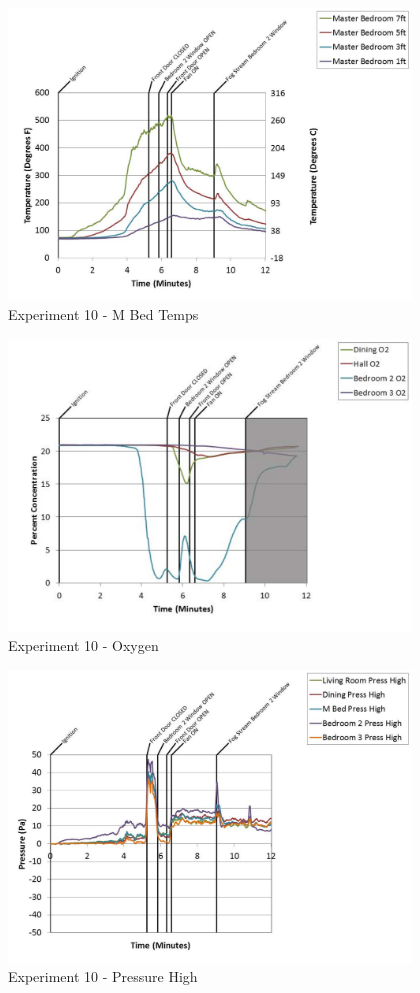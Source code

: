 \documentclass{article}
\begin{document}
\begin{appendices}
	\clearpage

	\begin{figure}[h!]
		\centering
		\includegraphics[height=3.05in]{0_Images/Results_Charts/Exp_10_Charts/MBedTemps.pdf}
		\caption{Experiment 10 - M Bed Temps}
	\end{figure}
 

	\begin{figure}[h!]
		\centering
		\includegraphics[height=3.05in]{0_Images/Results_Charts/Exp_10_Charts/Oxygen.pdf}
		\caption{Experiment 10 - Oxygen}
	\end{figure}
 
	\clearpage

	\begin{figure}[h!]
		\centering
		\includegraphics[height=3.05in]{0_Images/Results_Charts/Exp_10_Charts/PressureHigh.pdf}
		\caption{Experiment 10 - Pressure High}
	\end{figure}
 


\end{appendices}
\end{document}
